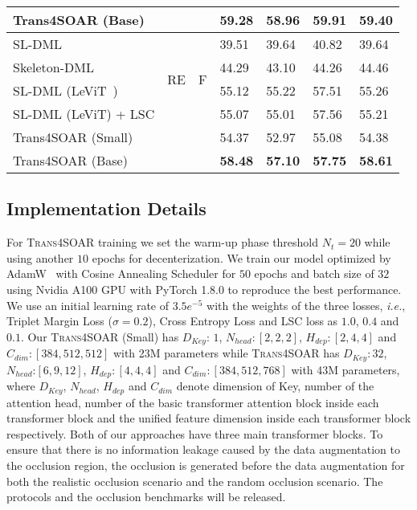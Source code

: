 \documentclass[lettersize,journal]{IEEEtran}
\begin{document}
\begin{table}[t]
{\begin{tabular}{l|c|c|llll}
Trans4SOAR (Base) &&& \textbf{59.28} & \textbf{58.96} & \textbf{59.91} &\textbf{59.40} \\ 
\midrule
SL-DML~\cite{memmesheimer2021sl} & \multirow{4}{*}{RE} & \multirow{4}{*}{F} & 39.51 & 39.64 & 40.82 & 39.64  \\
Skeleton-DML~\cite{memmesheimer2020skeleton_dml} & & & 44.29 & 43.10& 44.26& 44.46\\
SL-DML (LeViT~\cite{graham2021levit}) & & & 55.12 & 55.22& 57.51& 55.26\\

SL-DML (LeViT) + LSC & & & 55.07 & 55.01 & 57.56 &55.21 \\
Trans4SOAR (Small)&  &  & 54.37 & 52.97 & 55.08 &54.38  \\

Trans4SOAR (Base) & & & \textbf{58.48} & \textbf{57.10} & \textbf{57.75} & \textbf{58.61}  \\
\bottomrule
\end{tabular}}
\end{table}
\subsection{Implementation Details}
For \textsc{Trans4SOAR} training we set the warm-up phase threshold $N_t = 20$ while using another $10$ epochs for decenterization. We train our model optimized by AdamW~\cite{loshchilov2017decoupled} with Cosine Annealing Scheduler for $50$ epochs and batch size of $32$ using Nvidia A100 GPU with PyTorch 1.8.0 to reproduce the best performance. We use an initial learning rate of $3.5e^{-5}$ with the weights of the three losses, \textit{i.e.}, Triplet Margin Loss ($\sigma=0.2$), Cross Entropy Loss and LSC loss as $1.0$, $0.4$ and $0.1$. Our \textsc{Trans4SOAR} (Small) has $D_{Key}$: $1$, $N_{head}:[2,2,2]$, $H_{dep}:[2,4,4]$ and $C_{dim}:[384,512,512]$ with 23M parameters while \textsc{Trans4SOAR} has $D_{Key}: 32$, $N_{head}$:$[6,9,12]$, $H_{dep}:[4,4,4]$ and $C_{dim}:[384,512,768]$ with 43M parameters, where $D_{Key}$, $N_{head}$, $H_{dep}$ and $C_{dim}$ denote dimension of Key, number of the attention head, number of the basic transformer attention block inside each transformer block and the unified feature dimension inside each transformer block respectively. Both of our approaches have three main transformer blocks.
To ensure that there is no information leakage caused by the data augmentation to the occlusion region, the occlusion is generated before the data augmentation for both the realistic occlusion scenario and the random occlusion scenario.
The protocols and the occlusion benchmarks will be released.
\end{document}
